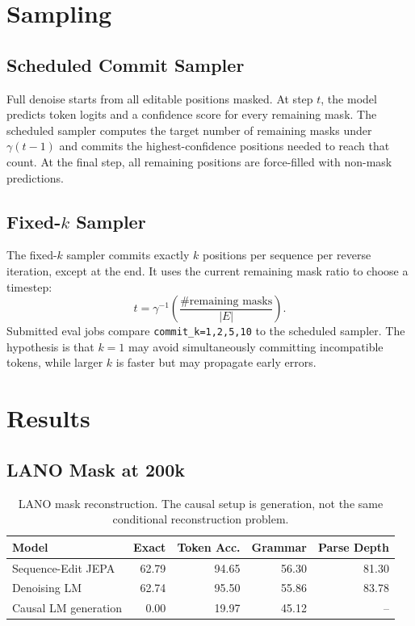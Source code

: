\documentclass[11pt]{article}
\begin{document}
\section{Sampling}

\subsection{Scheduled Commit Sampler}

Full denoise starts from all editable positions masked.  At step $t$, the model
predicts token logits and a confidence score for every remaining mask.  The
scheduled sampler computes the target number of remaining masks under
$\gamma(t-1)$ and commits the highest-confidence positions needed to reach that
count.  At the final step, all remaining positions are force-filled with
non-mask predictions.

\subsection{Fixed-$k$ Sampler}

The fixed-$k$ sampler commits exactly $k$ positions per sequence per reverse
iteration, except at the end.  It uses the current remaining mask ratio to
choose a timestep:
\[
  t = \gamma^{-1}\left(\frac{\#\text{remaining masks}}{|E|}\right).
\]
Submitted eval jobs compare \texttt{commit\_k=1,2,5,10} to the scheduled
sampler.  The hypothesis is that $k=1$ may avoid simultaneously committing
incompatible tokens, while larger $k$ is faster but may propagate early errors.

\section{Results}

\subsection{LANO Mask at 200k}

\begin{table}[h]
\centering
\begin{tabular}{lrrrr}
\toprule
Model & Exact & Token Acc. & Grammar & Parse Depth \\
\midrule
Sequence-Edit JEPA & 62.79 & 94.65 & 56.30 & 81.30 \\
Denoising LM & 62.74 & 95.50 & 55.86 & 83.78 \\
Causal LM generation & 0.00 & 19.97 & 45.12 & -- \\
\bottomrule
\end{tabular}
\caption{LANO mask reconstruction.  The causal setup is generation, not the same
conditional reconstruction problem.}
\end{table}
\end{document}

